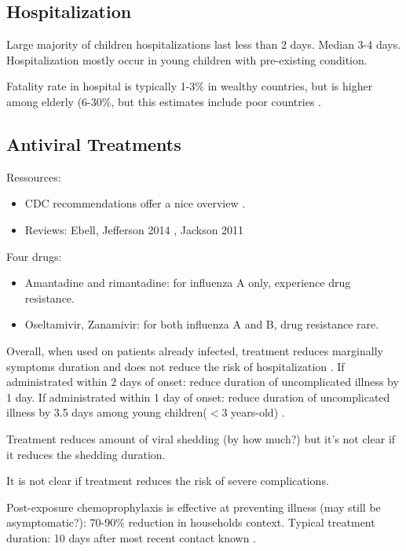 \documentclass[11pt, onecolumn]{article}
\begin{document}
\subsection{Hospitalization}

Large majority of children hospitalizations last less than 2 days. Median 3-4 days. Hospitalization mostly occur in young children with pre-existing condition.

Fatality rate in hospital is typically 1-3\% in wealthy countries, but is higher among elderly (6-30\%, but this estimates include poor countries \cite{Wong:2015bb}.



\subsection{Antiviral Treatments}
\label{sec:antiviral}
Ressources:
\begin{itemize}
\item  CDC recommendations offer a nice overview \cite{CDC:2011wq}.
\item Reviews: Ebell\cite{Ebell:2014ic},  Jefferson 2014 \cite{Jefferson:2014ei}, Jackson 2011 \cite{Jackson:2011ff}
\end{itemize}

Four drugs: 
\begin{itemize}
\item Amantadine and rimantadine: for influenza A only, experience drug resistance.
\item Oseltamivir, Zanamivir: for both influenza A and B, drug resistance rare.
\end{itemize}

Overall, when used on patients already infected, treatment reduces marginally symptoms duration and does not reduce the risk of hospitalization \cite{Ebell:2014ic,Jefferson:2014ei}. 
If administrated within 2 days of onset: reduce duration of uncomplicated illness by 1 day.
If administrated within 1 day of onset: reduce duration of uncomplicated illness by 3.5 days among young children($<3$ years-old) \cite{CDC:2011wq}.

Treatment reduces amount of viral shedding (by how much?) but it's not clear if it reduces the shedding duration.

It is not clear if treatment reduces the risk of severe complications.

Post-exposure chemoprophylaxis is effective at preventing illness (may still be asymptomatic?): 70-90\% reduction in households context. Typical treatment duration: 10 days after most recent contact known \cite{CDC:2011wq}.
\end{document}

